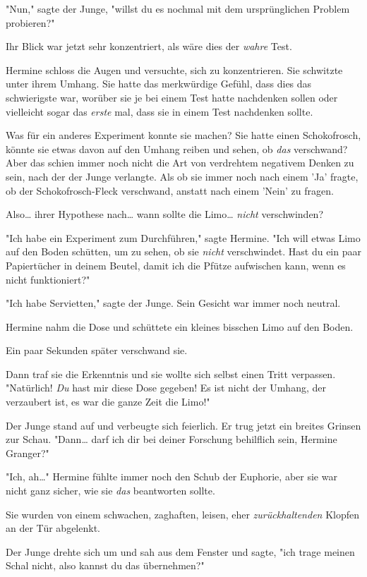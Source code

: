 {"Nun," sagte der Junge, "willst du es nochmal mit dem ursprünglichen Problem probieren?"

Ihr Blick war jetzt sehr konzentriert, als wäre dies der \emph{wahre} Test.

Hermine schloss die Augen und versuchte, sich zu konzentrieren. Sie schwitzte unter ihrem Umhang. Sie hatte das merkwürdige Gefühl, dass dies das schwierigste war, worüber sie je bei einem Test hatte nachdenken sollen oder vielleicht sogar das \emph{erste} mal, dass sie in einem Test nachdenken sollte.

Was für ein anderes Experiment konnte sie machen? Sie hatte einen Schokofrosch, könnte sie etwas davon auf den Umhang reiben und sehen, ob \emph{das} verschwand? Aber das schien immer noch nicht die Art von verdrehtem negativem Denken zu sein, nach der der Junge verlangte. Als ob sie immer noch nach einem 'Ja' fragte, ob der Schokofrosch-Fleck verschwand, anstatt nach einem 'Nein' zu fragen.

Also… ihrer Hypothese nach… wann sollte die Limo… \emph{nicht} verschwinden?

"Ich habe ein Experiment zum Durchführen," sagte Hermine. "Ich will etwas Limo auf den Boden schütten, um zu sehen, ob sie \emph{nicht} verschwindet. Hast du ein paar Papiertücher in deinem Beutel, damit ich die Pfütze aufwischen kann, wenn es nicht funktioniert?"

"Ich habe Servietten," sagte der Junge. Sein Gesicht war immer noch neutral.

Hermine nahm die Dose und schüttete ein kleines bisschen Limo auf den Boden.

Ein paar Sekunden später verschwand sie.

Dann traf sie die Erkenntnis und sie wollte sich selbst einen Tritt verpassen. "Natürlich! \emph{Du} hast mir diese Dose gegeben! Es ist nicht der Umhang, der verzaubert ist, es war die ganze Zeit die Limo!"

Der Junge stand auf und verbeugte sich feierlich. Er trug jetzt ein breites Grinsen zur Schau. "Dann… darf ich dir bei deiner Forschung behilflich sein, Hermine Granger?"

"Ich, ah…" Hermine fühlte immer noch den Schub der Euphorie, aber sie war nicht ganz sicher, wie sie \emph{das} beantworten sollte.

Sie wurden von einem schwachen, zaghaften, leisen, eher \emph{zurückhaltenden} Klopfen an der Tür abgelenkt.

Der Junge drehte sich um und sah aus dem Fenster und sagte, "ich trage meinen Schal nicht, also kannst du das übernehmen?"

}
